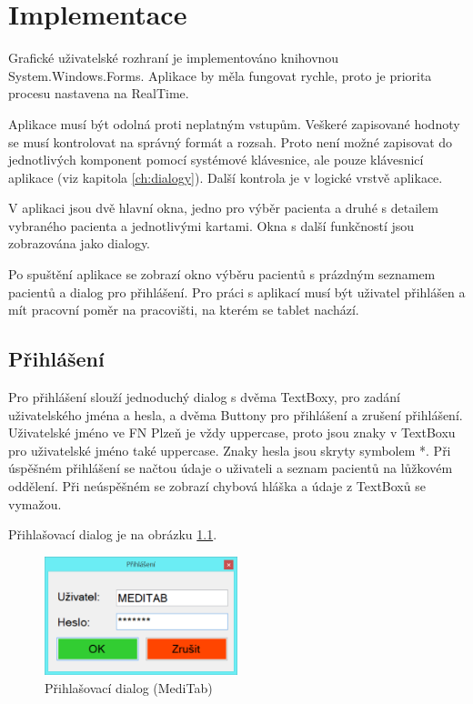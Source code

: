 \chapter{Implementace}

Grafické uživatelské rozhraní je implementováno knihovnou System.Windows.Forms. Aplikace by měla fungovat rychle, proto je priorita procesu nastavena na RealTime.

Aplikace musí být odolná proti neplatným vstupům. Veškeré zapisované hodnoty se musí kontrolovat na správný formát a rozsah. Proto není možné zapisovat do jednotlivých komponent pomocí systémové klávesnice, ale pouze klávesnicí aplikace (viz kapitola \ref{ch:dialogy}). Další kontrola je v logické vrstvě aplikace.

V aplikaci jsou dvě hlavní okna, jedno pro výběr pacienta a druhé s detailem vybraného pacienta a jednotlivými kartami. Okna s další funkčností jsou zobrazována jako dialogy.

Po spuštění aplikace se zobrazí okno výběru pacientů s prázdným seznamem pacientů a dialog pro přihlášení. Pro práci s aplikací musí být uživatel přihlášen a mít pracovní poměr na pracovišti, na kterém se tablet nachází.


\section{Přihlášení}

Pro přihlášení slouží jednoduchý dialog s dvěma TextBoxy, pro zadání uživatelského jména a hesla, a dvěma Buttony pro přihlášení a zrušení přihlášení. Uživatelské jméno ve FN Plzeň je vždy uppercase, proto jsou znaky v TextBoxu pro uživatelské jméno také uppercase. Znaky hesla jsou skryty symbolem *. Při úspěšném přihlášení se načtou údaje o uživateli a seznam pacientů na lůžkovém oddělení. Při neúspěšném se zobrazí chybová hláška a údaje z TextBoxů se vymažou.

Přihlašovací dialog je na obrázku \ref{fig:login}.

\begin{figure}[H]
	\centering
	\includegraphics[width=0.5\textwidth]{img/meditab/login.eps}
	\caption{Přihlašovací dialog (MediTab)}
  \label{fig:login}
\end{figure}


